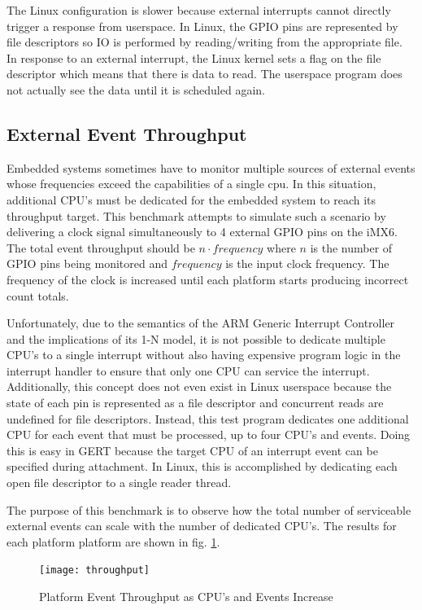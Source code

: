 The Linux configuration is slower because external interrupts cannot directly trigger a response
from userspace. In Linux, the GPIO pins are represented by file descriptors so
IO is performed by reading/writing from the appropriate file. In response to an external interrupt,
the Linux kernel sets a flag on the file descriptor which means that there is data to read. The userspace
program does not actually see the data until it is scheduled again.

\subsection{External Event Throughput} \label{sec:thruput}
Embedded systems sometimes have to monitor multiple sources of external events
whose frequencies exceed the capabilities of a single cpu. In this situation,
additional CPU's must be dedicated for the embedded system to reach its throughput
target. This benchmark attempts to simulate such a scenario by delivering a clock
signal simultaneously to 4 external GPIO pins on the iMX6. The total event throughput
should be $n \cdot frequency$ where $n$ is the number of GPIO pins being monitored and
$frequency$ is the input clock frequency. The frequency of the clock is
increased until each platform starts producing incorrect count totals.

Unfortunately, due to the semantics of the ARM Generic Interrupt Controller and the implications of its 1-N model,
it is not possible to dedicate
multiple CPU's to a single interrupt without also having expensive program logic in the interrupt handler to ensure that
only one CPU can service the interrupt. Additionally, this concept does not even exist in Linux userspace
because the state of each pin is represented as a file descriptor and concurrent reads are undefined for file descriptors.
Instead, this test program dedicates one additional CPU for each event that must be processed, up to four CPU's and events.
Doing this is easy in GERT because the target CPU of an interrupt event can be specified during attachment.
In Linux, this is accomplished by dedicating each open file descriptor to a single reader thread.

The purpose of this benchmark is to observe how the total number of serviceable external events can scale
with the number of dedicated CPU's. The results for each platform platform are shown in fig. \ref{fig:thrugraph}.

\begin{figure}[h]
\begin{center}
  \texttt{[image: throughput]}
\end{center}
  \caption{Platform Event Throughput as CPU's and Events Increase} \label{fig:thrugraph}
\end{figure}

